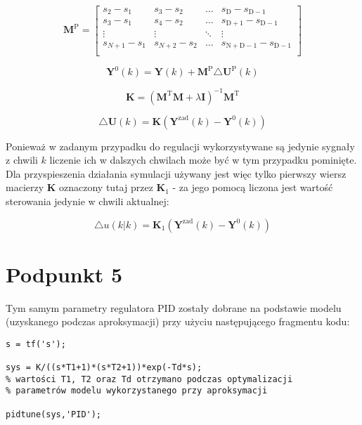 \begin{equation}
\boldsymbol{M}^{\mathrm{P}}=\left[
\begin{array}
{cccc}
s_{2} - s_{1} & s_{3} - s_{2} & \ldots & s_{\mathrm{D}} - s_{\mathrm{D-1}}\\
s_{3} - s_{1} & s_{4} - s_{2} & \ldots & s_{\mathrm{D+1}} - s_{\mathrm{D-1}}\\
\vdots & \vdots & \ddots & \vdots\\
s_{N+1} - s_{1} & s_{N+2} - s_{2} & \ldots & s_{\mathrm{N+D-1}} - s_{\mathrm{D-1}}\\
\end{array}
\right]
\label{MParray}
\end{equation}

\begin{equation}
\boldsymbol{Y}^{0}(k) = \boldsymbol{Y}(k) + \boldsymbol{M}^{\mathrm{P}} \triangle \boldsymbol{U}^{\mathrm{P}}(k)
\label{Y0k}
\end{equation}

\begin{equation}
\boldsymbol{K} = (\boldsymbol{M}^{\mathrm{T}} \boldsymbol{M} + \lambda \boldsymbol{I})^{-1} \boldsymbol{M}^{\mathrm{T}}
\label{Karray}
\end{equation}

\begin{equation}
\triangle \boldsymbol{U}(k) = \boldsymbol{K}(\boldsymbol{Y}^{\mathrm{zad}}(k) - \boldsymbol{Y}^{0}(k))
\label{dukdmc}
\end{equation}

Ponieważ w zadanym przypadku do regulacji wykorzystywane są jedynie sygnały z chwili $k$ liczenie ich w dalszych chwilach może być w tym przypadku pominięte. Dla przyspieszenia działania symulacji używany jest więc tylko pierwszy wiersz macierzy $\boldsymbol{K}$ oznaczony tutaj przez $\boldsymbol{K}_1$ - za jego pomocą liczona jest wartość sterowania jedynie w chwili aktualnej:

\begin{equation}
	\triangle u(k|k) = \boldsymbol{K}_1 (\boldsymbol{Y}^{\mathrm{zad}}(k) - \boldsymbol{Y}^{0}(k))
\end{equation}

\chapter{Podpunkt 5}

Tym samym parametry regulatora PID zostały dobrane na podstawie modelu (uzyskanego podczas aproksymacji) przy użyciu następującego fragmentu kodu:

\begin{lstlisting}[style=Matlab-editor]
s = tf('s');

sys = K/((s*T1+1)*(s*T2+1))*exp(-Td*s);
% wartości T1, T2 oraz Td otrzymano podczas optymalizacji
% parametrów modelu wykorzystanego przy aproksymacji

pidtune(sys,'PID');
\end{lstlisting} 

